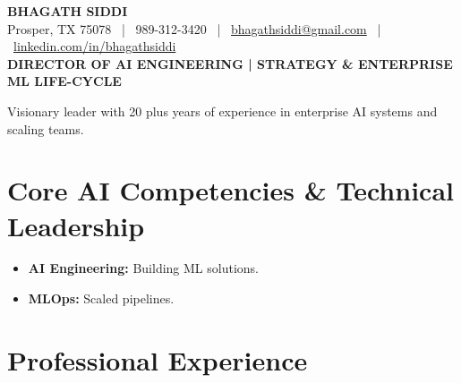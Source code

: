 \documentclass[9pt, letterpaper]{extarticle}
\begin{document}
\begin{center}
    {\huge \textbf{BHAGATH SIDDI}} \\
    \vspace{1pt}
    \small Prosper, TX 75078 \ | \ 989-312-3420 \ | \ \href{mailto:bhagathsiddi@gmail.com}{bhagathsiddi@gmail.com} \ | \ \href{https://www.linkedin.com/in/bhagathsiddi}{linkedin.com/in/bhagathsiddi} \\
    \vspace{2pt} 
    \textbf{\large DIRECTOR OF AI ENGINEERING | STRATEGY \& ENTERPRISE ML LIFE-CYCLE}
\end{center}

\vspace{-6pt}
{
\small \centering
Visionary leader with 20 plus years of experience in enterprise AI systems and scaling teams.
\par}

\vfill %

\section{Core AI Competencies \& Technical Leadership}
\begin{itemize}
\item \textbf{AI Engineering:} Building ML solutions.
\item \textbf{MLOps:} Scaled pipelines.
\end{itemize}

\vfill

\section{Professional Experience}
\end{document}
